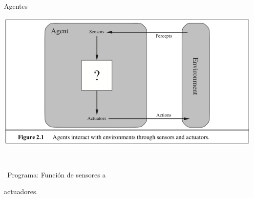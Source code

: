 \documentclass[11pt]{beamer}
\begin{document}
\begin{frame}{Agentes}

\begin{minipage}{.65\linewidth}

\includegraphics[scale=.2]{imagenes/agente.png}

\

\HandRight\, Programa: Función de sensores a\par actuadores.

\end{minipage}\begin{minipage}{.3\linewidth}


\end{minipage}
\end{frame}
\end{document}
